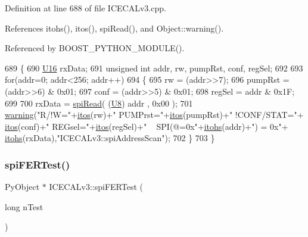 Definition at line 688 of file I\+C\+E\+C\+A\+Lv3.\+cpp.



References itohs(), itos(), spi\+Read(), and Object\+::warning().



Referenced by B\+O\+O\+S\+T\+\_\+\+P\+Y\+T\+H\+O\+N\+\_\+\+M\+O\+D\+U\+L\+E().


\begin{DoxyCode}
689 \{
690     \hyperlink{ICECALv3_8h_adf928e51a60dba0df29d615401cc55a8}{U16} rxData;
691     \textcolor{keywordtype}{unsigned} \textcolor{keywordtype}{int} addr, rw, pumpRst, conf, regSel;
692 
693     \textcolor{keywordflow}{for}(addr=0; addr<256; addr++)
694     \{
695         rw      = (addr>>7);
696         pumpRst = (addr>>6) & 0x01;
697         conf    = (addr>>5) & 0x01;
698         regSel  = addr & 0x1F;
699 
700         rxData = \hyperlink{classICECALv3_aced41ce20a0853d6248b8df88412e57a}{spiRead}( (\hyperlink{ICECALv3_8h_a3cb25ca6f51f003950f9625ff05536fc}{U8}) addr , 0x00 );
701         \hyperlink{classObject_a65cd4fda577711660821fd2cd5a3b4c9}{warning}(\textcolor{stringliteral}{"R/!W="}+\hyperlink{Tools_8h_af330027dbdafb9a30768b3613c553e60}{itos}(rw)+\textcolor{stringliteral}{" PUMPrst="}+\hyperlink{Tools_8h_af330027dbdafb9a30768b3613c553e60}{itos}(pumpRst)+\textcolor{stringliteral}{" !CONF/STAT="}+
      \hyperlink{Tools_8h_af330027dbdafb9a30768b3613c553e60}{itos}(conf)+\textcolor{stringliteral}{" REGsel="}+\hyperlink{Tools_8h_af330027dbdafb9a30768b3613c553e60}{itos}(regSel)+\textcolor{stringliteral}{" ~ SPI(@=0x"}+\hyperlink{classICECALv3_a04b02e583f191bfce34d05132cd23834}{itohs}(addr)+\textcolor{stringliteral}{") = 0x"}+
      \hyperlink{classICECALv3_a04b02e583f191bfce34d05132cd23834}{itohs}(rxData),\textcolor{stringliteral}{"ICECALv3::spiAddressScan"});
702     \}
703 \}
\end{DoxyCode}
\mbox{\label{classICECALv3_a8639cf6a44cba85b53128b5e1dc21e15}} 
\subsubsection{\texorpdfstring{spi\+F\+E\+R\+Test()}{spiFERTest()}}
{\footnotesize\ttfamily Py\+Object $\ast$ I\+C\+E\+C\+A\+Lv3\+::spi\+F\+E\+R\+Test (\begin{DoxyParamCaption}\item[{long}]{n\+Test }\end{DoxyParamCaption})}



